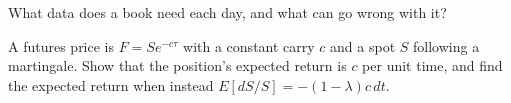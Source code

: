 \begin{interviewq}\label{iq:s1:carry-across-asset-classes:5}
What data does a  book need each day, and what can go wrong with it?
\end{interviewq}

\begin{interviewq}\label{iq:s1:carry-across-asset-classes:6}
A futures price is $F = S e^{-c\tau}$ with a constant carry $c$ and a spot $S$ following a martingale. Show that the position's expected return is $c$
per unit time, and find the expected return when instead $E[dS/S] = -(1 - \lambda) c\, dt$.
\end{interviewq}
